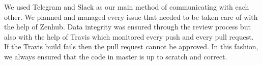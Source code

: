 \documentclass[]{article}
\begin{document}
We used Telegram and Slack as our main method of communicating with each other. We planned and
managed every issue that needed to be taken care of with the help of Zenhub. Data integrity was 
ensured through the review process but also with the help of Travis which monitored every push and
every pull request. If the Travis build fails then the pull request cannot be approved. In this fashion,
we always ensured that the code in master is up to scratch and correct.
\end{document}
